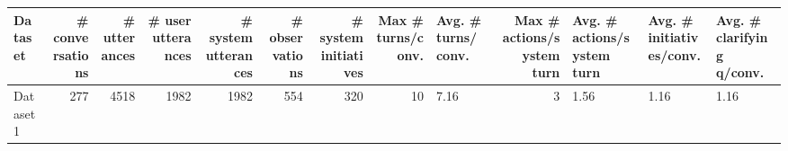 \begin{tabular}{lrrrrrrrlrlll}
\toprule
Dataset & # conversations & # utterances & # user utterances & # system utterances & # observations & # system initiatives & Max # turns/conv. & Avg. # turns/conv. & Max # actions/system turn & Avg. # actions/system turn & Avg. # initiatives/conv. & Avg. # clarifying q/conv. \\
\midrule
Dataset1 & 277 & 4518 & 1982 & 1982 & 554 & 320 & 10 & 7.16 & 3 & 1.56 & 1.16 & 1.16 \\
\bottomrule
\end{tabular}
